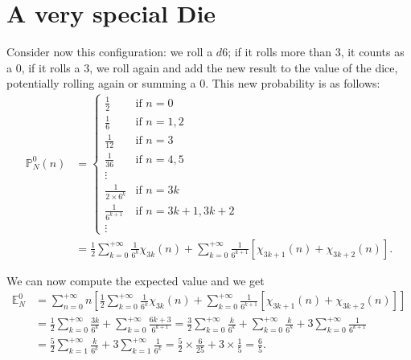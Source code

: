 \documentclass[a4paper,oneside,11pt]{book}
\renewcommand{\Pr}{\mathbb{P}}
\begin{document}
\section{A very special Die}
Consider now this configuration: we roll a $d6$; if it rolls more than $3$, it counts as a $0$, if it rolls a $3$, we roll again and add the new result to the value of the dice, potentially rolling again or summing a $0$. This new probability is as follows:
\begin{align}
	\Pr_N^0\left(n\right)
	&=\left\{\begin{array}{cl}
		\frac12 							& \mbox{if } n=0	\\
		\frac16 							& \mbox{if } n=1,2	\\
		\frac1{12} 						& \mbox{if } n=3	\\
		\frac1{36} 						& \mbox{if } n=4,5	\\
		\vdots								&	\\
		\frac1{2\times6^{k}} 	& \mbox{if } n=3k	\\
		\frac1{6^{k+1}} 			& \mbox{if } n=3k+1,3k+2	\\
		\vdots
	\end{array}\right.
\\
	&=\frac12\sum_{k=0}^{+\infty}\frac1{6^k}\chi_{3k}(n)
	+\sum_{k=0}^{+\infty}\frac1{6^{k+1}}
	\left[
		\chi_{3k+1}(n)
		+\chi_{3k+2}(n)
	\right].
\end{align}

We can now compute the expected value and we get
\begin{align}
	\mathbb{E}_N^0
	&=\sum_{n=0}^{+\infty}n\left[
		\frac12\sum_{k=0}^{+\infty}\frac1{6^k}\chi_{3k}(n)
		+\sum_{k=0}^{+\infty}\frac1{6^{k+1}}
		\left[
			\chi_{3k+1}(n)
			+\chi_{3k+2}(n)
		\right]
	\right]
\\
	&=\frac12\sum_{k=0}^{+\infty}\frac{3k}{6^k}
	+\sum_{k=0}^{+\infty}\frac{6k+3}{6^{k+1}}
	=\frac32\sum_{k=0}^{+\infty}\frac{k}{6^k}
	+\sum_{k=0}^{+\infty}\frac{k}{6^{k}}
	+3\sum_{k=0}^{+\infty}\frac1{6^{k+1}}
\\
	&=\frac52\sum_{k=1}^{+\infty}\frac{k}{6^k}
	+3\sum_{k=1}^{+\infty}\frac1{6^k}
	=\frac52\times\frac6{25}
	+3\times\frac15=\frac65.
\end{align}
\end{document}
